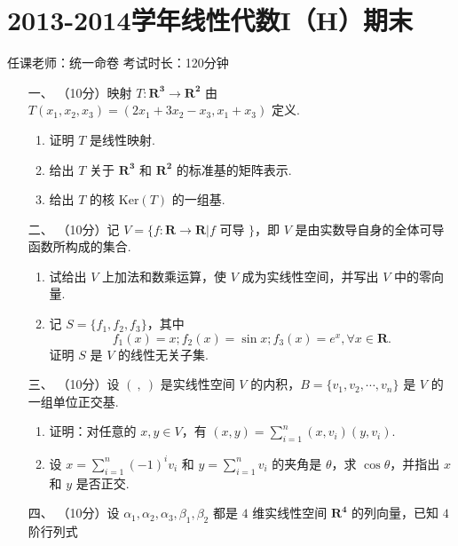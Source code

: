 \section*{2013-2014学年线性代数I（H）期末}

\begin{center}
    任课老师：统一命卷\hspace{4em} 考试时长：120分钟
\end{center}

\begin{enumerate}
    \item [一、]（10分）映射 $T:\mathbf{R^3} \to \mathbf{R^2}$ 由 $T(x_1,x_2,x_3)=(2x_1+3x_2-x_3,x_1+x_3)$ 定义.
    \begin{enumerate}[label=(\arabic*)]
        \item 证明 $T$ 是线性映射.
        \item 给出 $T$ 关于 $\mathbf{R^3}$ 和 $\mathbf{R^2}$ 的标准基的矩阵表示.
        \item 给出 $T$ 的核 $\mathrm{Ker}(T)$ 的一组基.
    \end{enumerate}
    \item [二、]（10分）记 $V=\{f:\mathbf{R}\to \mathbf{R}|f$ 可导 $\}$，即 $V$ 是由实数导自身的全体可导函数所构成的集合.
    \begin{enumerate}[label=(\arabic*)]
        \item 试给出 $V$ 上加法和数乘运算，使 $V$ 成为实线性空间，并写出 $V$ 中的零向量.
        \item 记 $S=\{f_1,f_2,f_3\}$，其中
        \[f_1(x)=x;f_2(x)=\sin x;f_3(x)=e^x,\forall x \in \mathbf{R}.\]
        证明 $S$ 是 $V$ 的线性无关子集.
    \end{enumerate}
    \item [三、]（10分）设 $(\ ,\ )$ 是实线性空间 $V$ 的内积，$B=\{v_1,v_2,\cdots,v_n\}$ 是 $V$ 的一组单位正交基.
    \begin{enumerate}[label=(\arabic*)]
        \item 证明：对任意的 $x,y \in V$，有 $(x,y) = \sum\limits_{i=1}^n(x,v_i)(y,v_i).$
        \item 设 $x=\sum\limits_{i=1}^n(-1)^iv_i$ 和 $y=\sum\limits_{i=1}^nv_i$ 的夹角是 $\theta$，求 $\cos \theta$，并指出 $x$ 和 $y$ 是否正交.
    \end{enumerate}
    \item [四、]（10分）设 $\alpha_1,\alpha_2,\alpha_3,\beta_1,\beta_2$ 都是 $4$ 维实线性空间 $\mathbf{R^4}$ 的列向量，已知 $4$ 阶行列式

\end{enumerate}
